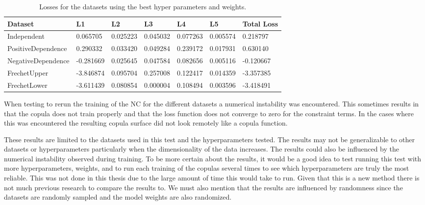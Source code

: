     
\begin{table}[h!]
    \centering
    \caption{Losses for the datasets using the best hyper parameters and weights.}
    \begin{tabular}{lllllll}
        \textbf{Dataset} & \textbf{L1}& \textbf{L2}& \textbf{L3}& \textbf{L4}& \textbf{L5}& \textbf{Total Loss} \\
        \midrule
        Independent & 0.065705 & 0.025223 & 0.045032 & 0.077263 & 0.005574 & 0.218797 \\
        PositiveDependence & 0.290332 & 0.033420 & 0.049284 & 0.239172 & 0.017931 & 0.630140 \\
        NegativeDependence & -0.281669 & 0.025645 & 0.047584 & 0.082656 & 0.005116 & -0.120667 \\
        FrechetUpper & -3.846874 & 0.095704 & 0.257008 & 0.122417 & 0.014359 & -3.357385 \\
        FrechetLower & -3.611439 & 0.080854 & 0.000004 & 0.108494 & 0.003596 & -3.418491 \\
        \end{tabular}
    \label{tab:LossesBestParameters}
\end{table}

\begin{remark}
    When testing to rerun the training of the \gls{NC} for the different datasets a numerical instability was encountered. This sometimes results in that the copula does not train properly and that the loss function does not converge to zero for the constraint terms. In the cases where this was encountered the resulting copula surface did not look remotely like a copula function. 
\end{remark}

These results are limited to the datasets used in this test and the hyperparameters tested. The results may not be generalizable to other datasets or hyperparameters particularly when the dimensionality of the data increases. The results could also be influenced by the numerical instability observed during training. To be more certain about the results, it would be a good idea to test running this test with more hyperparameters, weights, and to run each training of the copulas several times to see which hyperparameters are truly the most reliable. This was not done in this thesis due to the large amount of time this would take to run. Given that this is a new method there is not much previous research to compare the results to. We must also mention that the results are influenced by randomness since the datasets are randomly sampled and the model weights are also randomized. 


